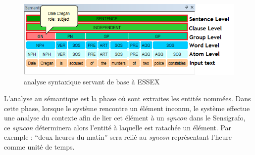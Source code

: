 \documentclass[PhD-Yoann-Dupont.tex]{subfiles}
\begin{document}
\begin{figure}[ht!]
\centering
\includegraphics[scale=0.7]{images/ExpertSystem/disambiguation_html_21066960}
\caption{analyse syntaxique servant de base à ESSEX}
\label{fig:cogito-syntactic-analysis}
\end{figure}

L'analyse au sémantique est la phase où sont extraites les entités nommées. Dans cette phase, lorsque le système rencontre un élément inconnu, le système effectue une analyse du contexte afin de lier cet élément à un \emph{syncon} dans le Sensigrafo, ce \emph{syncon} déterminera alors l'entité à laquelle est ratachée un élément. Par exemple : ``deux heures du matin'' sera relié au \emph{syncon} représentant l'heure comme unité de temps.
\end{document}
